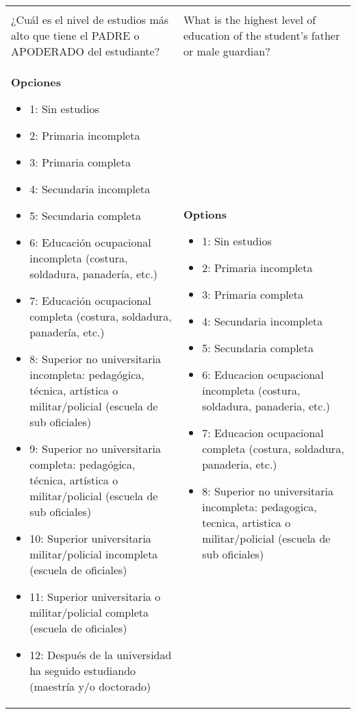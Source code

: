 \documentclass[11pt]{article}
\begin{document}
\begin{longtable}{@{}LL@{}}
\addlinespace[4pt]
 \\ 
¿Cuál es el nivel de estudios más alto que tiene el PADRE o APODERADO del estudiante? & What is the highest level of education of the student's father or male guardian? \\
\textbf{Opciones}\par\begin{itemize}[leftmargin=*]\item 1: Sin estudios
\item 2: Primaria incompleta
\item 3: Primaria completa
\item 4: Secundaria incompleta
\item 5: Secundaria completa
\item 6: Educación ocupacional incompleta (costura, soldadura, panadería, etc.)
\item 7: Educación ocupacional completa (costura, soldadura, panadería, etc.)
\item 8: Superior no universitaria incompleta: pedagógica, técnica, artística o militar/policial (escuela de sub oficiales)
\item 9: Superior no universitaria completa: pedagógica, técnica, artística o militar/policial (escuela de sub oficiales)
\item 10: Superior universitaria militar/policial incompleta (escuela de oficiales)
\item 11: Superior universitaria o militar/policial completa (escuela de oficiales)
\item 12: Después de la universidad ha seguido estudiando (maestría y/o doctorado)\end{itemize} & \textbf{Options}\par\begin{itemize}[leftmargin=*]\item 1: Sin estudios
\item 2: Primaria incompleta
\item 3: Primaria completa
\item 4: Secundaria incompleta
\item 5: Secundaria completa
\item 6: Educacion ocupacional incompleta (costura, soldadura, panaderia, etc.)
\item 7: Educacion ocupacional completa (costura, soldadura, panaderia, etc.)
\item 8: Superior no universitaria incompleta: pedagogica, tecnica, artistica o militar/policial (escuela de sub oficiales)

\end{itemize}
\end{longtable}
\end{document}
